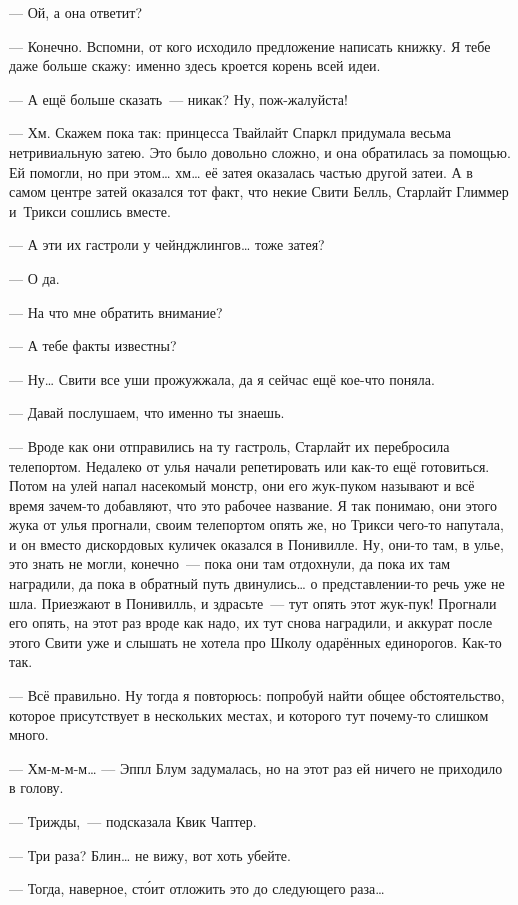 \documentclass[fontsize=11pt,a5paper,titlepage=firstcover]{scrbook}
\begin{document}
--- Ой, а она ответит?

--- Конечно. Вспомни, от кого исходило предложение написать книжку. Я тебе даже больше скажу: именно здесь кроется корень всей идеи.

--- А ещё больше сказать~--- никак? Ну, пож-жалуйста!

--- Хм. Скажем пока так: принцесса Твайлайт Спаркл придумала весьма нетривиальную затею. Это было довольно сложно, и она обратилась за помощью. Ей помогли, но при этом{\ldots} хм{\ldots} её затея оказалась частью другой затеи. А в самом центре затей оказался тот факт, что некие Свити Белль, Старлайт Глиммер и~Трикси сошлись вместе.

--- А эти их гастроли у чейнджлингов{\ldots} тоже затея?

--- О да.

--- На что мне обратить внимание?

--- А тебе факты известны?

--- Ну{\ldots} Свити все уши прожужжала, да я сейчас ещё кое-что поняла.

--- Давай послушаем, что именно ты знаешь.

--- Вроде как они отправились на ту гастроль, Старлайт их перебросила телепортом. Недалеко от улья начали репетировать или как-то ещё готовиться. Потом на улей напал насекомый монстр, они его жук-пуком называют и всё время зачем-то добавляют, что это рабочее название. Я так понимаю, они этого жука от улья прогнали, своим телепортом опять же, но Трикси чего-то напутала, и он вместо дискордовых куличек оказался в Понивилле. Ну, они-то там, в улье, это знать не могли, конечно~--- пока они там отдохнули, да пока их там наградили, да пока в обратный путь двинулись{\ldots} о представлении-то речь уже не шла. Приезжают в Понивилль, и здрасьте~--- тут опять этот жук-пук! Прогнали его опять, на этот раз вроде как надо, их тут снова наградили, и аккурат после этого Свити уже и слышать не хотела про Школу одарённых единорогов. Как-то так.

--- Всё правильно. Ну тогда я повторюсь: попробуй найти общее обстоятельство, которое присутствует в нескольких местах, и которого тут почему-то слишком много.

--- Хм-м-м-м{\ldots} --- Эппл Блум задумалась, но на этот раз ей ничего не приходило в голову.

--- Трижды,~--- подсказала Квик Чаптер.

--- Три раза? Блин{\ldots} не вижу, вот хоть убейте.

--- Тогда, наверное, сто́ит отложить это до следующего раза{\ldots}
\end{document}
